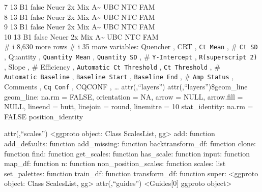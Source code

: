 \documentclass[
]{article}
\begin{document}
7 13 B1 false Neuer 2x Mix A\textasciitilde{} UBC NTC FAM\\
8 13 B1 false Neuer 2x Mix A\textasciitilde{} UBC NTC FAM\\
9 13 B1 false Neuer 2x Mix A\textasciitilde{} UBC NTC FAM\\
10 13 B1 false Neuer 2x Mix A\textasciitilde{} UBC NTC FAM\\
\# i 8,630 more rows \# i 35 more variables: Quencher , CRT ,
\texttt{Ct\ Mean} , \# \texttt{Ct\ SD} , Quantity ,
\texttt{Quantity\ Mean} , \texttt{Quantity\ SD} , \#
\texttt{Y-Intercept} , \texttt{R(superscript\ 2)} , Slope , \#
Efficiency , \texttt{Automatic\ Ct\ Threshold} , \texttt{Ct\ Threshold}
, \# \texttt{Automatic\ Baseline} , \texttt{Baseline\ Start} ,
\texttt{Baseline\ End} , \# \texttt{Amp\ Status} , Comments ,
\texttt{Cq\ Conf} , CQCONF , \ldots{} attr(,``layers'')
attr(,``layers'')\$geom\_line geom\_line: na.rm = FALSE, orientation =
NA, arrow = NULL, arrow.fill = NULL, lineend = butt, linejoin = round,
linemitre = 10 stat\_identity: na.rm = FALSE position\_identity

attr(,``scales'') \textless ggproto object: Class ScalesList,
gg\textgreater{} add: function add\_defaults: function add\_missing:
function backtransform\_df: function clone: function find: function
get\_scales: function has\_scale: function input: function map\_df:
function n: function non\_position\_scales: function scales: list
set\_palettes: function train\_df: function transform\_df: function
super: \textless ggproto object: Class ScalesList, gg\textgreater{}
attr(,``guides'') \textless Guides{[}0{]} ggproto object\textgreater{}
\end{document}
